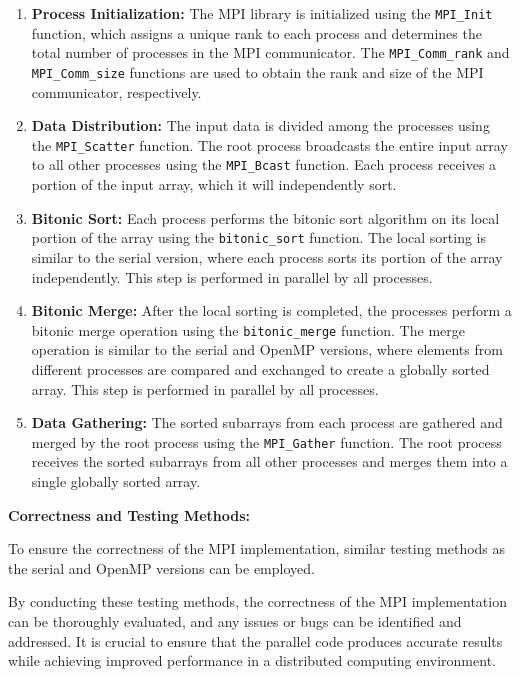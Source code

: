 \begin{enumerate}
\item \textbf{Process Initialization:} The MPI library is initialized using the \lstinline{MPI_Init} function, which assigns a unique rank to each process and determines the total number of processes in the MPI communicator. The \lstinline{MPI_Comm_rank} and \lstinline{MPI_Comm_size} functions are used to obtain the rank and size of the MPI communicator, respectively.

\item \textbf{Data Distribution:} The input data is divided among the processes using the \lstinline{MPI_Scatter} function. The root process broadcasts the entire input array to all other processes using the \lstinline{MPI_Bcast} function. Each process receives a portion of the input array, which it will independently sort.

\item \textbf{Bitonic Sort:} Each process performs the bitonic sort algorithm on its local portion of the array using the \lstinline{bitonic_sort} function. The local sorting is similar to the serial version, where each process sorts its portion of the array independently. This step is performed in parallel by all processes.

\item \textbf{Bitonic Merge:} After the local sorting is completed, the processes perform a bitonic merge operation using the \lstinline{bitonic_merge} function. The merge operation is similar to the serial and OpenMP versions, where elements from different processes are compared and exchanged to create a globally sorted array. This step is performed in parallel by all processes.

\item \textbf{Data Gathering:} The sorted subarrays from each process are gathered and merged by the root process using the \lstinline{MPI_Gather} function. The root process receives the sorted subarrays from all other processes and merges them into a single globally sorted array.
\end{enumerate}

\textbf{Correctness and Testing Methods:}

To ensure the correctness of the MPI implementation, similar testing methods as the serial and OpenMP versions can be employed.

By conducting these testing methods, the correctness of the MPI implementation can be thoroughly evaluated, and any issues or bugs can be identified and addressed. It is crucial to ensure that the parallel code produces accurate results while achieving improved performance in a distributed computing environment.

